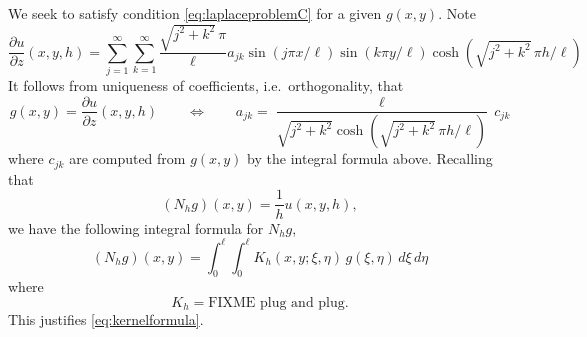 \documentclass[letterpaper,final,12pt,reqno]{amsart}
\theoremstyle{cstyle}
\theoremstyle{cstyle*}
\theoremstyle{dstyle}
\begin{document}
We seek to satisfy condition \eqref{eq:laplaceproblemC} for a given $g(x,y)$.  Note
    $$\frac{\partial u}{\partial z}(x,y,h) = \sum_{j=1}^\infty \sum_{k=1}^\infty \frac{\sqrt{j^2+k^2}\, \pi}{\ell} a_{jk} \sin(j\pi x/\ell) \sin(k\pi y/\ell) \cosh(\sqrt{j^2+k^2}\, \pi h/\ell)$$
It follows from uniqueness of coefficients, i.e.~orthogonality, that
    $$g(x,y) = \frac{\partial u}{\partial z}(x,y,h) \qquad \iff \qquad a_{jk} = \frac{\ell}{\sqrt{j^2+k^2} \cosh(\sqrt{j^2+k^2}\, \pi h/\ell)} \,c_{jk}$$
where $c_{jk}$ are computed from $g(x,y)$ by the integral formula above.  Recalling that
    $$(N_h g)(x,y) = \frac{1}{h} u(x,y,h),$$
we have the following integral formula for $N_h g$,
    $$(N_h g)(x,y) = \int_0^\ell \int_0^\ell K_h(x,y;\xi,\eta)\, g(\xi,\eta)\,d\xi\,d\eta$$
where
    $$K_h = \text{FIXME plug and plug}.$$
This justifies \eqref{eq:kernelformula}.
\end{document}
